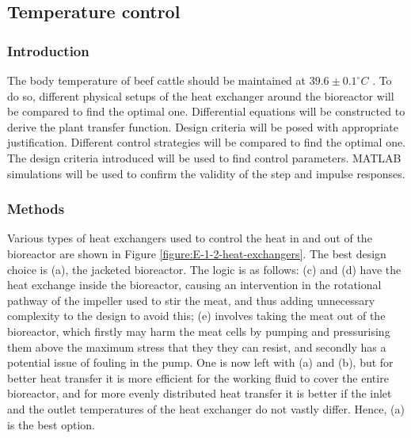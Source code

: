 \vspace{-10mm}
\subsection{Temperature control}
\vspace{-3mm}
\subsubsection{Introduction}


The body temperature of beef cattle should be maintained at $39.6 \pm 0.1 ^{\circ} C$ \cite{E-Gaughan2014}. To do so, different physical setups of the heat exchanger around the bioreactor will be compared to find the optimal one. Differential equations will be constructed to derive the plant transfer function. Design criteria will be posed with appropriate justification. Different control strategies will be compared to find the optimal one. The design criteria introduced will be used to find control parameters. MATLAB simulations will be used to confirm the validity of the step and impulse responses.

\subsubsection{Methods}


Various types of heat exchangers used to control the heat in and out of the bioreactor are shown in Figure \ref{figure:E-1-2-heat-exchangers}. The best design choice is (a), the jacketed bioreactor. The logic is as follows: (c) and (d) have the heat exchange inside the bioreactor, causing an intervention in the rotational pathway of the impeller used to stir the meat, and thus adding unnecessary complexity to the design to avoid this; (e) involves taking the meat out of the bioreactor, which firstly may harm the meat cells by pumping and pressurising them above the maximum stress that they they can resist, and secondly has a potential issue of fouling in the pump. One is now left with (a) and (b), but for better heat transfer it is more efficient for the working fluid to cover the entire bioreactor, and for more evenly distributed heat transfer it is better if the inlet and the outlet temperatures of the heat exchanger do not vastly differ. Hence, (a) is the best option.

